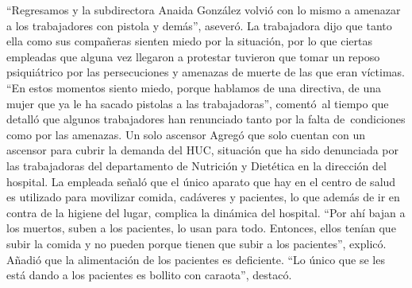 \documentclass{article}%
\begin{document}
%
“Regresamos y la subdirectora Anaida González volvió con lo mismo a amenazar a los trabajadores con pistola y demás”, aseveró.%
\newline%
%
La trabajadora dijo que tanto ella como sus compañeras sienten miedo por la situación, por lo que ciertas empleadas que alguna vez llegaron a protestar tuvieron que tomar un reposo psiquiátrico por las persecuciones y amenazas de muerte de las que eran víctimas.%
\newline%
%
“En estos momentos siento miedo, porque hablamos de una directiva, de una mujer que ya le ha sacado pistolas a las trabajadoras”, comentó~al tiempo que detalló que algunos trabajadores han renunciado tanto por la falta de~condiciones como por las amenazas.%
\newline%
%
Un solo ascensor%
\newline%
%
Agregó que solo cuentan con un ascensor para cubrir la demanda del HUC, situación que ha sido denunciada por las trabajadoras del departamento de Nutrición y Dietética en la dirección del hospital.%
\newline%
%
La empleada señaló que el único aparato que hay en el centro de salud es utilizado para movilizar comida, cadáveres y pacientes, lo que además de ir en contra de la higiene del lugar, complica la dinámica del hospital.%
\newline%
%
“Por ahí bajan a los muertos, suben a los pacientes, lo usan para todo. Entonces, ellos tenían que subir la comida y no pueden porque tienen que subir a los pacientes”, explicó.%
\newline%
%
Añadió que la alimentación de los pacientes es deficiente. “Lo único que se les está dando a los pacientes es bollito con caraota”, destacó.%
\newline%
%
\end{document}
